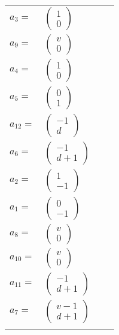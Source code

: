 \documentclass[1p]{elsarticle_modified}
\theoremstyle{definition}
\begin{document}
\begin{tabular}{m{7pt} m{180pt} m{7pt} m{180pt} }
\flushright $a_{3}=$&$\begin{pmatrix}1\\0\end{pmatrix}$ \\
\flushright $a_{9}=$&$\begin{pmatrix}v\\0\end{pmatrix}$ \\
\flushright $a_{4}=$&$\begin{pmatrix}1\\0\end{pmatrix}$ \\
\flushright $a_{5}=$&$\begin{pmatrix}0\\1\end{pmatrix}$ \\
\flushright $a_{12}=$&$\begin{pmatrix}-1\\d\end{pmatrix}$ \\
\flushright $a_{6}=$&$\begin{pmatrix}-1\\d+1\end{pmatrix}$ \\
\flushright $a_{2}=$&$\begin{pmatrix}1\\-1\end{pmatrix}$ \\
\flushright $a_{1}=$&$\begin{pmatrix}0\\-1\end{pmatrix}$ \\
\flushright $a_{8}=$&$\begin{pmatrix}v\\0\end{pmatrix}$ \\
\flushright $a_{10}=$&$\begin{pmatrix}v\\0\end{pmatrix}$ \\
\flushright $a_{11}=$&$\begin{pmatrix}-1\\d+1\end{pmatrix}$ \\
\flushright $a_{7}=$&$\begin{pmatrix}v-1\\d+1\end{pmatrix}$\\&\end{tabular}
\end{document}
